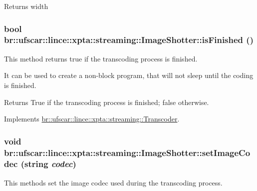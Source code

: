 \begin{DoxyReturn}{Returns}
width 
\end{DoxyReturn}
\hypertarget{classbr_1_1ufscar_1_1lince_1_1xpta_1_1streaming_1_1ImageShotter_a66d326a0a24e08c4b88e3a07ec1f4c5d}{
\subsubsection[{isFinished}]{\setlength{\rightskip}{0pt plus 5cm}bool br::ufscar::lince::xpta::streaming::ImageShotter::isFinished ()}}
\label{classbr_1_1ufscar_1_1lince_1_1xpta_1_1streaming_1_1ImageShotter_a66d326a0a24e08c4b88e3a07ec1f4c5d}


This method returns true if the transcoding process is finished. 

It can be used to create a non-\/block program, that will not sleep until the coding is finished. \begin{DoxyReturn}{Returns}
True if the transcoding process is finished; false otherwise. 
\end{DoxyReturn}


Implements \hyperlink{classbr_1_1ufscar_1_1lince_1_1xpta_1_1streaming_1_1Transcoder_aceabe1e9bb931313d5a52a53b9ab4af6}{br::ufscar::lince::xpta::streaming::Transcoder}.

\hypertarget{classbr_1_1ufscar_1_1lince_1_1xpta_1_1streaming_1_1ImageShotter_a574f65cd5a37b49817c2298b25f9ac45}{
\subsubsection[{setImageCodec}]{\setlength{\rightskip}{0pt plus 5cm}void br::ufscar::lince::xpta::streaming::ImageShotter::setImageCodec (string {\em codec})}}
\label{classbr_1_1ufscar_1_1lince_1_1xpta_1_1streaming_1_1ImageShotter_a574f65cd5a37b49817c2298b25f9ac45}


This methods set the image codec used during the transcoding process. 


